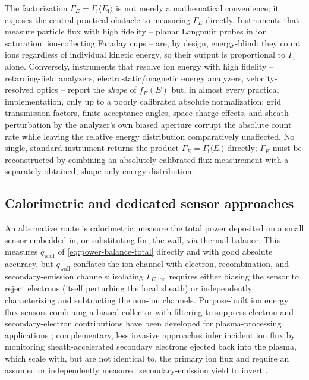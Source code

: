 The factorization $\Gamma_{E} = \Gamma_{\mathrm{i}} \langle E_{\mathrm{i}}\rangle$ is not merely a mathematical convenience; it exposes the central practical obstacle to measuring $\Gamma_{E}$ directly. Instruments that measure particle flux with high fidelity -- planar Langmuir probes in ion saturation, ion-collecting Faraday cups -- are, by design, energy-blind: they count ions regardless of individual kinetic energy, so their output is proportional to $\Gamma_{\mathrm{i}}$ alone. Conversely, instruments that resolve ion energy with high fidelity -- retarding-field analyzers, electrostatic/magnetic energy analyzers, velocity-resolved optics -- report the \emph{shape} of $f_E(E)$ but, in almost every practical implementation, only up to a poorly calibrated absolute normalization: grid transmission factors, finite acceptance angles, space-charge effects, and sheath perturbation by the analyzer's own biased aperture corrupt the absolute count rate while leaving the relative energy distribution comparatively unaffected. No single, standard instrument returns the product $\Gamma_{E} = \Gamma_{\mathrm{i}} \langle E_{\mathrm{i}} \rangle$ directly; $\Gamma_{E}$ must be reconstructed by combining an absolutely calibrated flux measurement with a separately obtained, shape-only energy distribution.

\subsection{Calorimetric and dedicated sensor approaches}

An alternative route is calorimetric: measure the total power deposited on a small sensor embedded in, or substituting for, the wall, via thermal balance. This measures $q_{\mathrm{wall}}$ of \cref{eq:power-balance-total} directly and with good absolute accuracy, but $q_{\mathrm{wall}}$ conflates the ion channel with electron, recombination, and secondary-emission channels; isolating $\Gamma_{E,\mathrm{ion}}$ requires either biasing the sensor to reject electrons (itself perturbing the local sheath) or independently characterizing and subtracting the non-ion channels. Purpose-built ion energy flux sensors combining a biased collector with filtering to suppress electron and secondary-electron contributions have been developed for plasma-processing applications \cite{ref0075}; complementary, less invasive approaches infer incident ion flux by monitoring sheath-accelerated secondary electrons ejected back into the plasma, which scale with, but are not identical to, the primary ion flux and require an assumed or independently measured secondary-emission yield to invert \cite{ref0078}.

